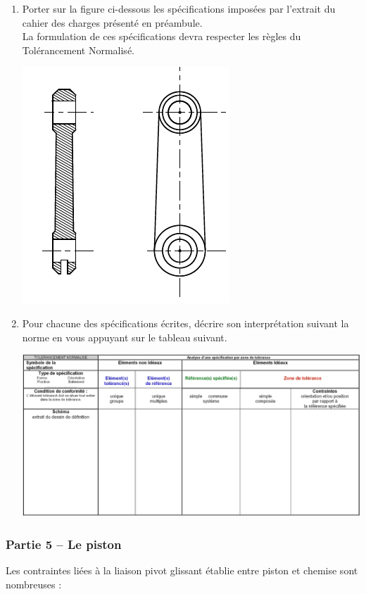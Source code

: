 \begin{enumerate}
\item Porter sur la figure ci-dessous les spécifications imposées par l'extrait du cahier des charges
présenté en préambule.\\
La formulation de ces spécifications devra respecter les règles du Tolérancement Normalisé.

\begin{center}
\includegraphics[scale=0.7]{png/bielle2.png}
\end{center}

\item Pour chacune des spécifications écrites, décrire son interprétation suivant la norme en vous appuyant sur le tableau suivant.

\begin{center}
\includegraphics[scale=0.55]{png/doc_rep.png}
\end{center}
\end{enumerate}


\newpage
\subsubsection{Partie 5 -- Le piston}
Les contraintes liées à la liaison pivot glissant établie entre piston et chemise sont nombreuses :

